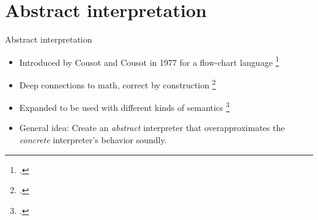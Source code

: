 \documentclass[aspectratio=169]{beamer}
\begin{document}

\section{Abstract interpretation}

\begin{frame}{Abstract interpretation}
  \begin{itemize}[<+->]
  \item Introduced by Cousot and Cousot in 1977 for a flow-chart language \footcite{cousot1977abstract}
  \item Deep connections to math, correct by construction \footcite{cousot1979systematic}
  \item Expanded to be used with different kinds of semantics \footcite{schmidt1998trace,schmidt2009abstract}
  \item General idea: Create an \emph{abstract} interpreter that
    overapproximates the \emph{concrete} interpreter's behavior
    soundly.
  \end{itemize}
\end{frame}

\begin{frame}{}
  
\end{frame}

\begin{frame}{}
  
\end{frame}

\begin{frame}{}
  
\end{frame}
\end{document}
